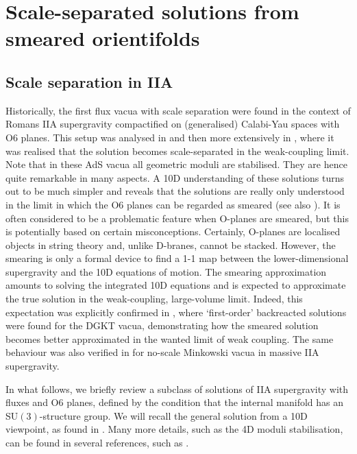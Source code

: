\documentclass[11pt]{article}
\renewcommand{\[}{\left[}
\renewcommand{\]}{\right]}
\renewcommand{\(}{\left(}
\renewcommand{\)}{\right)}
\newcommand{\<}{\langle}
\renewcommand{\>}{\rangle}
\begin{document}
\section{Scale-separated solutions from smeared orientifolds}
\label{scalsep}
\subsection{Scale separation in IIA}\label{sec:weak}

Historically, the first flux vacua with scale separation were found in the context of Romans IIA supergravity compactified on (generalised) Calabi-Yau spaces with O6 planes. This setup was analysed in \cite{Derendinger:2004jn, Villadoro:2005cu, Behrndt:2004mj} and then more extensively in \cite{DeWolfe:2005uu}, where it was realised that the solution becomes scale-separated in the weak-coupling limit. Note that in these AdS vacua all geometric moduli are stabilised. They are hence quite remarkable in many aspects. A 10D understanding of these solutions turns out to be much simpler and reveals that the solutions are really only understood in the limit in which the O6 planes can be regarded as smeared \cite{Grana:2006kf, Caviezel:2008ik} (see also \cite{Acharya:2006ne}). It is often considered to be a problematic feature when O-planes are smeared, but this is potentially based on certain misconceptions. Certainly, O-planes are localised objects in string theory and, unlike D-branes, cannot be stacked. However, the smearing is only a formal device to find a 1-1 map between the lower-dimensional supergravity and the 10D equations of motion. The smearing approximation amounts to solving the integrated 10D equations and is expected to approximate the true solution in the weak-coupling, large-volume limit. Indeed, this expectation was explicitly confirmed in \cite{Junghans:2020acz, Marchesano:2020qvg}, where
`first-order' backreacted solutions were found for the DGKT vacua, demonstrating how the smeared solution becomes better approximated in the wanted limit of weak coupling. The same behaviour was also verified in \cite{Baines:2020dmu} for no-scale Minkowski vacua in massive IIA supergravity. 

In what follows, we briefly review a subclass of solutions of IIA supergravity with fluxes and O6 planes, defined by the condition that the internal manifold has an SU$(3)$-structure group. We will recall the general solution from a 10D viewpoint, as found in \cite{Grana:2006kf}.  Many more details, such as the 4D moduli stabilisation, can be found in several references, such as \cite{DeWolfe:2005uu, Camara:2005dc,  Caviezel:2008ik}.
\end{document}

